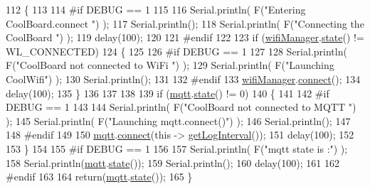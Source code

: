 \begin{DoxyCode}
112 \{
113 
114 \textcolor{preprocessor}{#if DEBUG == 1  }
115 
116     Serial.println( F(\textcolor{stringliteral}{"Entering CoolBoard.connect "}) );
117     Serial.println();
118     Serial.println( F(\textcolor{stringliteral}{"Connecting the CoolBoard  "}) );
119     delay(100);
120 
121 \textcolor{preprocessor}{#endif}
122 
123     \textcolor{keywordflow}{if} (\hyperlink{classCoolBoard_acd88e6003606b47479ebba81e4aceeca}{wifiManager}.\hyperlink{classCoolWifi_a1c7b4d82a4098d346e7593dce92039fa}{state}() != WL\_CONNECTED)
124     \{       
125     
126 \textcolor{preprocessor}{    #if DEBUG == 1      }
127 
128         Serial.println( F(\textcolor{stringliteral}{"CoolBoard not connected to WiFi "}) );
129         Serial.println( F(\textcolor{stringliteral}{"Launching CoolWifi"}) );
130         Serial.println();
131 
132 \textcolor{preprocessor}{    #endif}
133         \hyperlink{classCoolBoard_acd88e6003606b47479ebba81e4aceeca}{wifiManager}.\hyperlink{classCoolWifi_ad060353050f40d032a2dbf9e54a768bf}{connect}();
134         delay(100);
135     \}
136 
137 
138     
139     \textcolor{keywordflow}{if} (\hyperlink{classCoolBoard_a2399f44d7c23c1149a335cb3b46d90f1}{mqtt}.\hyperlink{classCoolMQTT_a5d003307eff78efbd585e42b43b72b6d}{state}() != 0)
140     \{   
141     
142 \textcolor{preprocessor}{    #if DEBUG == 1  }
143     
144         Serial.println( F(\textcolor{stringliteral}{"CoolBoard not connected to MQTT "}) );
145         Serial.println( F(\textcolor{stringliteral}{"Launching mqtt.connect()"}) );
146         Serial.println();
147 
148 \textcolor{preprocessor}{    #endif  }
149     
150         \hyperlink{classCoolBoard_a2399f44d7c23c1149a335cb3b46d90f1}{mqtt}.\hyperlink{classCoolMQTT_a58b0b1f64b269c2681685208262fba1d}{connect}(\textcolor{keyword}{this} -> \hyperlink{classCoolBoard_aaa24480b273fc095a1356a589c333781}{getLogInterval}());
151         delay(100);
152         
153     \}
154     
155 \textcolor{preprocessor}{#if DEBUG == 1}
156 
157     Serial.println( F(\textcolor{stringliteral}{"mqtt state is :"}) );
158     Serial.println(\hyperlink{classCoolBoard_a2399f44d7c23c1149a335cb3b46d90f1}{mqtt}.\hyperlink{classCoolMQTT_a5d003307eff78efbd585e42b43b72b6d}{state}());
159     Serial.println();
160     delay(100);
161 
162 \textcolor{preprocessor}{#endif}
163 
164     \textcolor{keywordflow}{return}(\hyperlink{classCoolBoard_a2399f44d7c23c1149a335cb3b46d90f1}{mqtt}.\hyperlink{classCoolMQTT_a5d003307eff78efbd585e42b43b72b6d}{state}());
165 \}
\end{DoxyCode}
